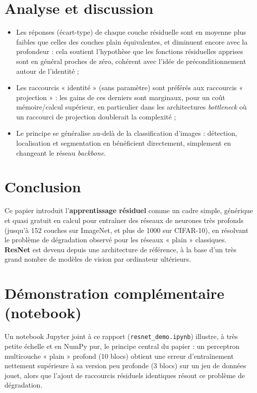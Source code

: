 \documentclass[a4paper,11pt]{article}
\begin{document}
\section{Analyse et discussion}
\begin{itemize}
    \item Les réponses (écart-type) de chaque couche résiduelle sont en moyenne plus faibles que celles des couches plain équivalentes, et diminuent encore avec la profondeur : cela soutient l'hypothèse que les fonctions résiduelles apprises sont en général proches de zéro, cohérent avec l'idée de préconditionnement autour de l'identité ;
    \item Les raccourcis « identité » (sans paramètre) sont préférés aux raccourcis « projection » : les gains de ces derniers sont marginaux, pour un coût mémoire/calcul supérieur, en particulier dans les architectures \emph{bottleneck} où un raccourci de projection doublerait la complexité ;
    \item Le principe se généralise au-delà de la classification d'images : détection, localisation et segmentation en bénéficient directement, simplement en changeant le réseau \emph{backbone}.
\end{itemize}

\section{Conclusion}
Ce papier introduit l'\textbf{apprentissage résiduel} comme un cadre simple, générique et quasi gratuit en calcul pour entraîner des réseaux de neurones très profonds (jusqu'à 152 couches sur ImageNet, et plus de 1000 sur CIFAR-10), en résolvant le problème de dégradation observé pour les réseaux « plain » classiques. \textbf{ResNet} est devenu depuis une architecture de référence, à la base d'un très grand nombre de modèles de vision par ordinateur ultérieurs.

\section{Démonstration complémentaire (notebook)}
Un notebook Jupyter joint à ce rapport (\texttt{resnet\_demo.ipynb}) illustre, à très petite échelle et en NumPy pur, le principe central du papier : un perceptron multicouche « plain » profond (10 blocs) obtient une erreur d'entraînement nettement supérieure à sa version peu profonde (3 blocs) sur un jeu de données jouet, alors que l'ajout de raccourcis résiduels identiques résout ce problème de dégradation.
\end{document}
